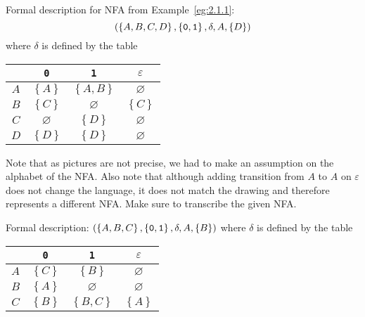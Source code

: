 \documentclass{notes}
\begin{document}
\begin{eg}
  Formal description for NFA from Example~\ref{eg:2.1.1}: 
  \[
    \left ( \left \{ A, B, C, D \right \}, \left \{ \verb~0~, \verb~1~ \right \}, \delta, A, \left \{ D \right \} \right )
  \]
  where $\delta$ is defined by the table 
  \begin{center}
    \begin{tabular}{c|ccc}
      & \verb~0~ & \verb~1~ & $\varepsilon$ \\ 
      \hline
      $A$ & $\left \{ A \right \}$ & $\left \{ A, B \right \}$ & $\varnothing$ \\ 
      $B$ & $\left \{ C \right \}$ & $\varnothing$ & $\left \{ C \right \}$ \\ 
      $C$ & $\varnothing$ & $\left \{ D \right \}$ & $\varnothing$ \\ 
      $D$ & $\left \{ D \right \}$ & $\left \{ D \right \}$ & $\varnothing$
    \end{tabular}
  \end{center}
  
  Note that as pictures are not precise, we had to make an assumption on the alphabet of the NFA.
  Also note that although adding transition from $A$ to $A$ on $\varepsilon$ does not change the language, it does not match the drawing and therefore represents a different NFA.
  Make sure to transcribe the given NFA.
\end{eg}

\begin{eg}
  Formal description: $(\left \{ A, B, C \right \}, \left \{ \verb~0~, \verb~1~ \right \}, \delta, A, \left \{ B \right \})$ where $\delta$ is defined by the table 
  \begin{center}
    \begin{tabular}{c|ccc}
      & \verb~0~ & \verb~1~ & $\varepsilon$ \\ 
      \hline
      $A$ & $\left \{ C \right \}$ & $\left \{ B \right \}$ & $\varnothing$ \\ 
      $B$ & $\left \{ A \right \}$ & $\varnothing$ & $\varnothing$ \\ 
      $C$ & $\left \{ B \right \}$ & $\left \{ B, C \right \}$ & $\left \{ A \right \}$ 
    \end{tabular}
  \end{center}
  
  \begin{center}
  \end{center}
\end{eg}
\end{document}
